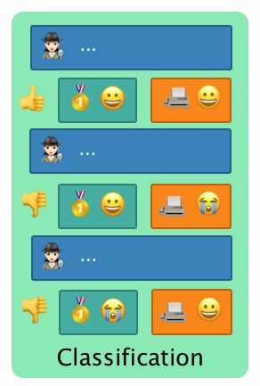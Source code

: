 \begin{figure}
  \centering
  \begin{subfigure}{0.25\textwidth}
  \includegraphics[width=\textwidth]{figures/incompleteness-classification}
  \end{subfigure} 
  \begin{subfigure}{0.25\textwidth}

\end{subfigure}
\end{figure}
